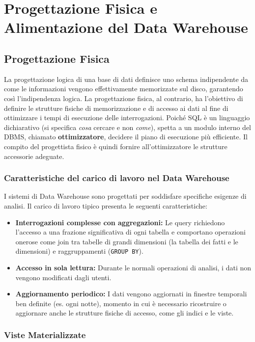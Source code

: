 \chapter{Progettazione Fisica e Alimentazione del Data Warehouse}

\section{Progettazione Fisica}
La progettazione logica di una base di dati definisce uno schema indipendente da come le informazioni vengono effettivamente memorizzate sul disco, garantendo così l'indipendenza logica. La progettazione fisica, al contrario, ha l'obiettivo di definire le strutture fisiche di memorizzazione e di accesso ai dati al fine di ottimizzare i tempi di esecuzione delle interrogazioni. 
Poiché SQL è un linguaggio dichiarativo (si specifica \textit{cosa} cercare e non \textit{come}), spetta a un modulo interno del DBMS, chiamato \textbf{ottimizzatore}, decidere il piano di esecuzione più efficiente. Il compito del progettista fisico è quindi fornire all'ottimizzatore le strutture accessorie adeguate.

\subsection{Caratteristiche del carico di lavoro nel Data Warehouse}
I sistemi di Data Warehouse sono progettati per soddisfare specifiche esigenze di analisi. Il carico di lavoro tipico presenta le seguenti caratteristiche:
\begin{itemize}
    \item \textbf{Interrogazioni complesse con aggregazioni:} Le query richiedono l'accesso a una frazione significativa di ogni tabella e comportano operazioni onerose come join tra tabelle di grandi dimensioni (la tabella dei fatti e le dimensioni) e raggruppamenti (\texttt{GROUP BY}).
    \item \textbf{Accesso in sola lettura:} Durante le normali operazioni di analisi, i dati non vengono modificati dagli utenti.
    \item \textbf{Aggiornamento periodico:} I dati vengono aggiornati in finestre temporali ben definite (es. ogni notte), momento in cui è necessario ricostruire o aggiornare anche le strutture fisiche di accesso, come gli indici e le viste.
\end{itemize}

\subsection{Viste Materializzate}
